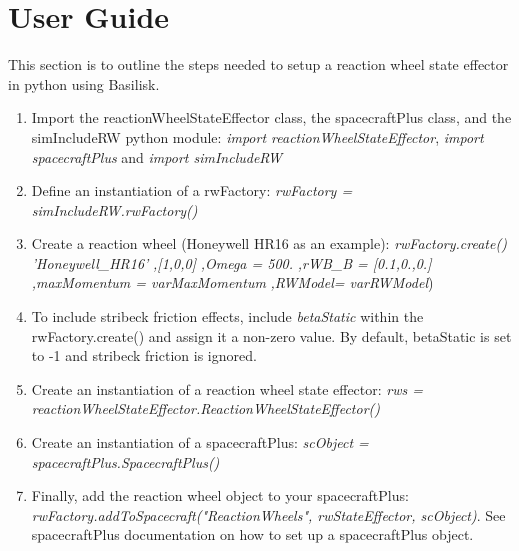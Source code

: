 \section{User Guide}

This section is to outline the steps needed to setup a reaction wheel state effector in python using Basilisk.

\begin{enumerate}
	\item Import the reactionWheelStateEffector class, the spacecraftPlus class, and the simIncludeRW python module: \newline \textit{import reactionWheelStateEffector}, \textit{import spacecraftPlus} and \textit{import simIncludeRW}
	\item Define an instantiation of a rwFactory: \newline
	\textit{rwFactory = simIncludeRW.rwFactory()}
	\item Create a reaction wheel (Honeywell HR16 as an example): \newline 
	\textit{rwFactory.create()} \newline
		\textit{'Honeywell\_HR16'} \newline
		\textit{,[1,0,0]} \newline
		\textit{,Omega = 500.} \newline
		\textit{,rWB\_B = [0.1,0.,0.]} \newline
		\textit{,maxMomentum = varMaxMomentum} \newline
		\textit{,RWModel= varRWModel})
	\item To include stribeck friction effects, include \textit{ betaStatic } within the rwFactory.create() and assign it a non-zero value. By default, betaStatic is set to -1 and stribeck friction is ignored. 
	\item Create an instantiation of a reaction wheel state effector: \newline \textit{rws = reactionWheelStateEffector.ReactionWheelStateEffector()}
	\item Create an instantiation of a spacecraftPlus: \newline
	\textit{scObject = spacecraftPlus.SpacecraftPlus()}
	\item Finally, add the reaction wheel object to your spacecraftPlus:\newline
	\textit{rwFactory.addToSpacecraft("ReactionWheels", rwStateEffector, scObject)}. See spacecraftPlus documentation on how to set up a spacecraftPlus object. 
\end{enumerate}
